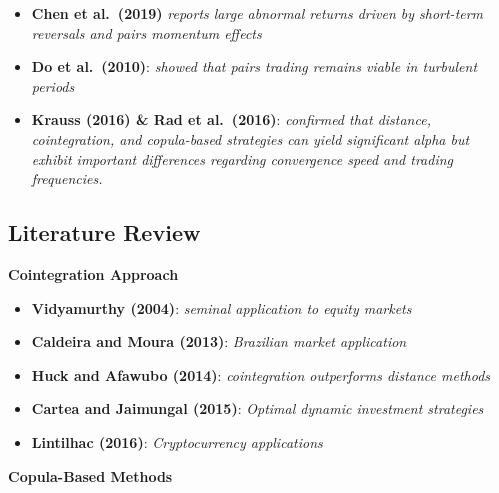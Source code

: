 \documentclass[
  letterpaper,
  DIV=11,
  numbers=noendperiod]{scrartcl}
\providecommand{\tightlist}{%
  \setlength{\itemsep}{0pt}\setlength{\parskip}{0pt}}\usepackage{longtable,booktabs,array}
\begin{document}
\begin{itemize}
\tightlist
\item
  \textbf{Chen et al.~(2019)} \emph{reports large abnormal returns
  driven by short-term reversals and pairs momentum effects}
\end{itemize}

\begin{itemize}
\tightlist
\item
  \textbf{Do et al.~(2010)}: \emph{showed that pairs trading remains
  viable in turbulent periods}
\end{itemize}

\begin{itemize}
\tightlist
\item
  \textbf{Krauss (2016) \& Rad et al.~(2016)}: \emph{confirmed that
  distance, cointegration, and copula-based strategies can yield
  significant alpha but exhibit important differences regarding
  convergence speed and trading frequencies.}
\end{itemize}

\subsection{Literature Review}\label{literature-review-2}

{\textbf{Cointegration Approach}}

\begin{itemize}
\tightlist
\item
  \textbf{Vidyamurthy (2004)}: \emph{seminal application to equity
  markets}
\item
  \textbf{Caldeira and Moura (2013)}: \emph{Brazilian market
  application}
\item
  \textbf{Huck and Afawubo (2014)}: \emph{cointegration outperforms
  distance methods}
\item
  \textbf{Cartea and Jaimungal (2015)}: \emph{Optimal dynamic investment
  strategies}
\item
  \textbf{Lintilhac (2016)}: \emph{Cryptocurrency applications}
\end{itemize}

{\textbf{Copula-Based Methods}}
\end{document}
